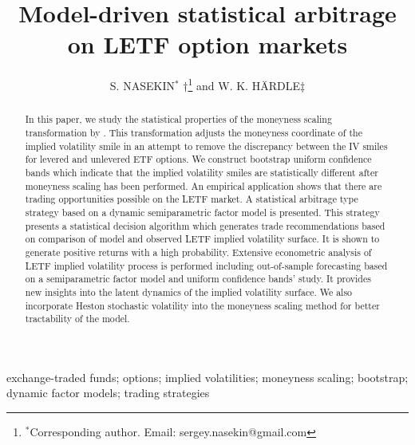 \documentclass{rQUF2e}
\theoremstyle{plain}
\theoremstyle{definition}
\begin{document}
	
	\title{Model-driven statistical arbitrage on LETF option markets}
	
	\author{S. NASEKIN$^{\ast}$ ${\dag}$\thanks{$^\ast$Corresponding author.
			Email: sergey.nasekin@gmail.com} and W. K. H\"{A}RDLE$\ddag$\\
		 }
	
	\maketitle

	
	
	\begin{abstract}
		In this paper, we study the statistical properties of the moneyness scaling transformation by \citet{leung_sircar}. This transformation adjusts the moneyness coordinate of the implied volatility smile in an attempt to remove the discrepancy between the IV smiles for levered and unlevered ETF options. We construct bootstrap uniform confidence bands which indicate that the implied volatility smiles are statistically different after moneyness scaling has been performed. 
		An empirical application shows that there are trading opportunities possible on the LETF market. A statistical arbitrage type strategy based on a dynamic semiparametric factor model is presented. This strategy presents a statistical decision algorithm which generates trade recommendations based on comparison of model and observed LETF implied volatility surface. It is shown to generate positive returns with a high probability.
		Extensive econometric analysis of LETF implied volatility process is performed including out-of-sample forecasting based on a semiparametric factor model and uniform confidence bands' study. It provides new insights into the latent dynamics of the implied volatility surface. We also incorporate Heston stochastic volatility into the moneyness scaling method for better tractability of the model.
	\end{abstract}
	
	\begin{keywords}
		exchange-traded funds; options; implied volatilities; moneyness scaling; bootstrap; dynamic factor models; trading strategies
	\end{keywords}
	
\end{document}
